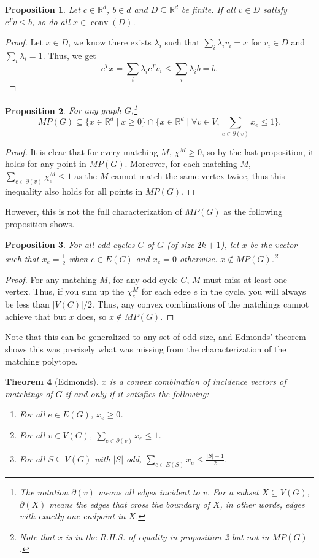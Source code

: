 \documentclass{tufte-handout}
\newtheorem{thm}{Theorem}
\newtheorem{prop}[thm]{Proposition}
\theoremstyle{definition}
\theoremstyle{remark}
\newcommand{\R}{\mathbb{R}}
\DeclareMathOperator{\conv}{conv}
\begin{document}
\begin{prop}
	Let $c \in \R^d$, $b \in d$ and $D \subseteq \R^d$ be finite. If all $v \in D$ satisfy $c^Tv \leq b$, so do all $x \in \conv(D)$.
\end{prop}
\begin{proof}
	Let $x \in D$, we know there exists $\lambda_i$ such that $\sum_i \lambda_i v_i = x$ for $v_i \in D$ and $\sum_i \lambda_i = 1$. Thus, we get 
	$$c^Tx = \sum_i \lambda_i c^Tv_i \leq \sum_i \lambda_i b = b.$$
\end{proof}
\begin{prop}\label{mpgalmost}
	For any graph $G$,\footnote{The notation $\partial(v)$ means all edges incident to $v$. For a subset $X \subseteq V(G)$, $\partial(X)$ means the edges that cross the boundary of $X$, in other words, edges with exactly one endpoint in $X$.} $$MP(G) \subseteq \{x\in \R^d \mid x \geq 0\} \cap \{x \in \R^d \mid \forall v \in V, \sum_{e \in \partial(v)} x_e \leq 1\}.$$
\end{prop}
\begin{proof}
	It is clear that for every matching $M$, $\chi^M \geq 0$, so by the last proposition, it holds for any point in $MP(G)$. Moreover, for each matching $M$, $\sum_{ e\in \partial(v)} \chi^M_e \leq 1$ as the $M$ cannot match the same vertex twice, thus this inequality also holds for all points in $MP(G)$.
\end{proof}
However, this is not the full characterization of $MP(G)$ as the following proposition shows.
\begin{prop}
	For all odd cycles $C$ of $G$ (of size $2k+1$), let $x$ be the vector such that $x_e = \frac{1}{2}$ when $e \in E(C)$ and $x_e = 0$ otherwise. $x \notin MP(G)$.\footnote{Note that $x$ is in the R.H.S. of equality in proposition \ref{mpgalmost} but not in $MP(G)$.}
\end{prop}
\begin{proof}
	For any matching $M$, for any odd cycle $C$, $M$ must miss at least one vertex. Thus, if you sum up the $\chi^M_e$ for each edge $e$ in the cycle, you will always be less than $|V(C)|/2$. Thus, any convex combinations of the matchings cannot achieve that but $x$ does, so $x \notin MP(G)$.
\end{proof}
Note that this can be generalized to any set of odd size, and Edmonds' theorem shows this was precisely what was missing from the characterization of the matching polytope. 

\begin{thm}[Edmonds]\label{edmonds}
	$x$ is a convex combination of incidence vectors of matchings of $G$ if and only if it satisfies the following:
	\begin{enumerate}
		\item For all $e \in E(G)$, $x_e \geq 0$.
		\item For all $v \in V(G)$, $\sum_{e \in\partial(v)} x_e \leq 1$.
		\item For all $S \subseteq V(G)$ with $|S|$ odd, $\sum_{e \in E(S)} x_e \leq \frac{|S|-1}{2}$.
	\end{enumerate}
\end{thm}
\end{document}

